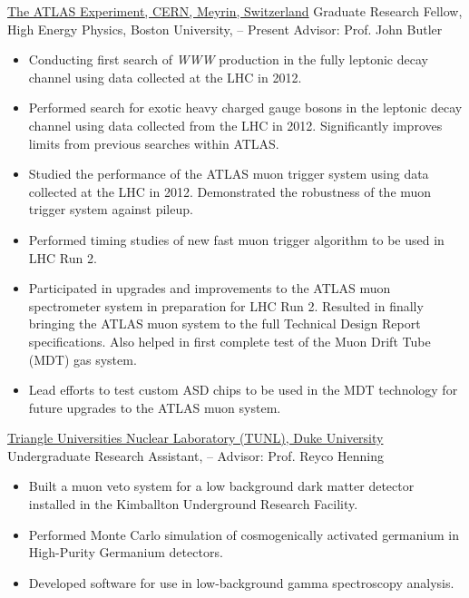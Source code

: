 \href{http://www.atlas.ch}{{The ATLAS Experiment}, CERN, Meyrin, Switzerland} \newline
Graduate Research Fellow, High Energy Physics, Boston University,  -- Present \newline
Advisor: Prof. John Butler
{\begin{itemize}
\item Conducting first search of \textit{WWW} production in the fully leptonic decay channel using data collected at the LHC in 2012.
\item Performed search for exotic heavy charged gauge bosons in the leptonic decay channel using data collected from the LHC in 2012. Significantly improves limits from previous searches within ATLAS.
\item Studied the performance of the ATLAS muon trigger system 
using data collected at the LHC in 2012.  Demonstrated the robustness of the muon trigger system against pileup.
\item Performed timing studies of new fast muon trigger algorithm to 
be used in LHC Run 2.
\item Participated in upgrades and improvements to the ATLAS muon spectrometer system in preparation for LHC Run 2.  Resulted in finally 
bringing the ATLAS muon system to the full Technical Design Report specifications. Also helped in first complete test of the Muon Drift Tube (MDT) gas system.
\item Lead efforts to test custom ASD chips to be used in the MDT 
technology for future upgrades to the ATLAS muon system.
\end{itemize}
}

\href{http://www.tunl.duke.edu}{{Triangle Universities Nuclear Laboratory (TUNL)}, Duke University} \newline
Undergraduate Research Assistant,  --  \newline
Advisor: Prof. Reyco Henning 
{\begin{itemize}
\item Built a muon veto system for a low background dark matter detector installed in the Kimballton Underground Research Facility.
\item Performed Monte Carlo simulation of cosmogenically activated germanium in High-Purity Germanium detectors.
\item Developed software for use in low-background gamma spectroscopy analysis.
\end{itemize}
}

